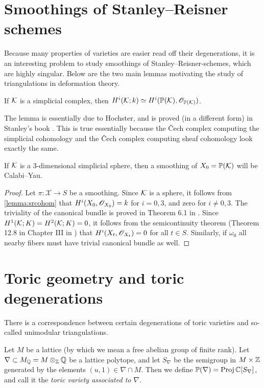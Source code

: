
\section{Smoothings of Stanley--Reisner schemes}

Because many properties of varieties are easier read off their degenerations, it is an interesting problem to study smoothings of Stanley--Reisner-schemes, which are highly singular. Below are the two main lemmas motivating the study of triangulations in deformation theory.

\begin{lemma}
\label{lemma:srcohom}
If $\mathcal{K}$ is a simplicial complex, then $H^i(\mathcal{K};k) \simeq H^i(\mathbb{P}(\mathcal{K}),\mathscr{O}_{\mathbb{P}(\mathcal{K})})$.
\end{lemma}
The lemma is essentially due to Hochster, and is proved (in a different form) in Stanley's book \cite{stanley_green}. This is true essentially because the \v{C}ech complex computing the simplicial cohomology and the \v{C}ech complex computing sheaf cohomology look exactly the same.

\begin{lemma}
If $\mathcal{K}$ is a 3-dimensional simplicial sphere, then a smoothing of $X_0=\mathbb{P}(\mathcal{K})$ will be Calabi--Yau.
\end{lemma}
\begin{proof}
Let $\pi:\mathscr X \to S$ be a smoothing. Since $\mathcal{K}$ is a sphere, it follows from \ref{lemma:srcohom} that $H^i(X_0,\mathscr{O}_{X_0})=k$ for $i=0,3$, and zero for $i \neq 0,3$. The triviality of the canonical bundle is proved in Theorem 6.1 in \cite{eisenbud_graphcurves}. Since $H^1(\mathcal{K};K)=H^2(\mathcal{K};K)=0$, it follows from the semicontinuity theorem (Theorem 12.8 in Chapter III in \cite{hartshorne}) that $H^i(X_t,\mathscr{O}_{X_t})=0$ for all $t \in S$. Similarly, if $\omega_0$ all nearby fibers must have trivial canonical bundle as well.
\end{proof}


\section{Toric geometry and toric degenerations}

There is a correspondence between certain degenerations of toric varieties and so-called unimodular triangulations. 

Let $M$ be a lattice (by which we mean a free abelian group of finite rank). Let $\nabla \subset M_{\mathbb{Q}} = M \otimes_{\mathbb{Z}} \mathbb{Q}$ be a lattice polytope, and let $S_\nabla$ be the semigroup in $M \times \mathbb{Z}$ generated by the elements $(u,1) \in \nabla \cap M$. Then we define $\mathbb{P}(\nabla)=\operatorname{Proj} \mathbb{C}[S_\nabla]$, and call it the \emph{toric variety associated to $\nabla$}. 

